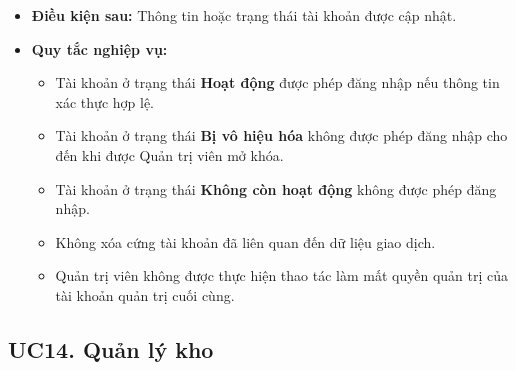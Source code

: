 \documentclass[12pt,a4paper]{article}
\begin{document}
\begin{itemize}
 \item \textbf{Điều kiện sau:} Thông tin hoặc trạng thái tài khoản được cập nhật.

 \item \textbf{Quy tắc nghiệp vụ:}

 \begin{itemize}

  \item Tài khoản ở trạng thái \textbf{Hoạt động} được phép đăng nhập nếu thông tin xác thực hợp lệ.

  \item Tài khoản ở trạng thái \textbf{Bị vô hiệu hóa} không được phép đăng nhập cho đến khi được Quản trị viên mở khóa.

  \item Tài khoản ở trạng thái \textbf{Không còn hoạt động} không được phép đăng nhập.

  \item Không xóa cứng tài khoản đã liên quan đến dữ liệu giao dịch.

  \item Quản trị viên không được thực hiện thao tác làm mất quyền quản trị của tài khoản quản trị cuối cùng.

 \end{itemize}

\end{itemize}


\subsection*{UC14. Quản lý kho}
\end{document}
